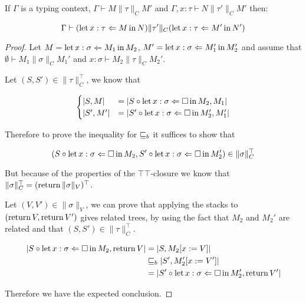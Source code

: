 \begin{alemma}
    If $\Gamma$ is a typing context,
    $\Gamma \vdash M \| \tau \|_C M'$ and 
    $\Gamma, x : \tau \vdash N \| \tau' \|_C M'$
    then:

    \begin{equation*}
        \Gamma \vdash (\Bind{M}{x:\tau}{N}) \| \tau' \|_C 
        (\Bind{M'}{x:\tau}{N'})
    \end{equation*}
\end{alemma}
\begin{proof}
Let $M = \Bind{M_1}{x:\sigma}{M_2}$,
$M' = \Bind{M_1'}{x:\sigma}{M_2'}$ and assume 
that $\emptyset \vdash M_1 \| \sigma \|_C M_1'$
and $x : \sigma \vdash M_2 \| \tau \|_C M_2'$.

Let $(S,S') \in \| \tau \|_C^\top$, we know that

\begin{equation*}
    \begin{cases}
        | S, M | &=
        | S \circ \Bind{\square}{x : \sigma}{M_2}, M_1| \\
        | S', M' | &=
        | S' \circ \Bind{\square}{x : \sigma}{M_2'}, M_1'| \\
    \end{cases}
\end{equation*}

Therefore to prove the inequality for $\sqeq_b$ it suffices 
to show that

\begin{equation*}
    (S \circ \Bind{\square}{x : \sigma}{M_2},
     S' \circ \Bind{\square}{x : \sigma}{M_2'})
     \in \| \sigma \|_C^\top
\end{equation*}

But because of the properties of the 
$\top\top$-closure we know that 
$\| \sigma \|_C^\top = (\Ret \| \sigma \|_V)^\top$.

Let $(V,V') \in \| \sigma \|_V$, we can prove that 
applying the stacks to $(\Ret V, \Ret V')$ gives 
related trees, by using the fact that $M_2$ and $M_2'$
are related and that $(S,S') \in \| \tau \|_C^\top$.

\begin{align*}
    | S \circ \Bind{\square}{x : \sigma}{M_2}, \Ret V| 
    &= |S,  M_2[ x := V] | \\
    & \sqeq_b |S', M_2' [ x := V'] | \\
    &= 
    | S' \circ \Bind{\square}{x : \sigma}{M_2'}, \Ret V'| 
\end{align*}

Therefore we have the expected conclusion.
\end{proof}

